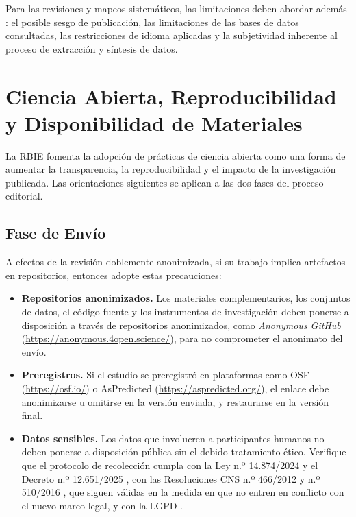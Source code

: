 \documentclass[spanish]{rbie2026}%
\begin{document}
Para las revisiones y mapeos sistemáticos, las limitaciones deben abordar además \citep{Kitchenham2023_SEGRESS_supp}: el posible sesgo de publicación, las limitaciones de las bases de datos consultadas, las restricciones de idioma aplicadas y la subjetividad inherente al proceso de extracción y síntesis de datos.



\section{Ciencia Abierta, Reproducibilidad y Disponibilidad de Materiales}
\label{sec:openscience}

La RBIE fomenta la adopción de prácticas de ciencia abierta como una forma de aumentar la transparencia, la reproducibilidad y el impacto de la investigación publicada. Las orientaciones siguientes se aplican a las dos fases del proceso editorial.


\subsection{Fase de Envío}

A efectos de la revisión doblemente anonimizada, si su trabajo implica artefactos en repositorios, entonces adopte estas precauciones:

\begin{itemize}
    \item \textbf{Repositorios anonimizados.} Los materiales complementarios, los conjuntos de datos, el código fuente y los instrumentos de investigación deben ponerse a disposición a través de repositorios anonimizados, como \textit{Anonymous GitHub} (\url{https://anonymous.4open.science/}), para no comprometer el anonimato del envío.

    \item \textbf{Preregistros.} Si el estudio se preregistró en plataformas como OSF (\url{https://osf.io/}) o AsPredicted (\url{https://aspredicted.org/}), el enlace debe anonimizarse u omitirse en la versión enviada, y restaurarse en la versión final.

    \item \textbf{Datos sensibles.} Los datos que involucren a participantes humanos no deben ponerse a disposición pública sin el debido tratamiento ético. Verifique que el protocolo de recolección cumpla con la Ley n.º 14.874/2024 \citep{brasil2024lei14874} y el Decreto n.º 12.651/2025 \citep{brasil2025decreto12651}, con las Resoluciones CNS n.º 466/2012 \citep{cns2012resolucao466} y n.º 510/2016 \citep{cns2016resolucao510}, que siguen válidas en la medida en que no entren en conflicto con el nuevo marco legal, y con la LGPD \citep{LGPD2018}.
\end{itemize}
\end{document}
